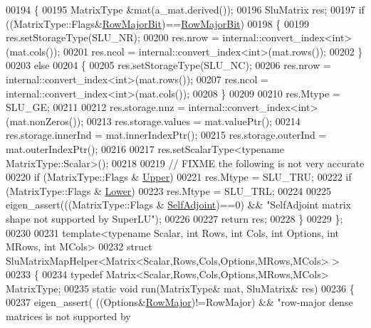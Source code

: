 \begin{DoxyCode}
00194   \{
00195     MatrixType &mat(a\_mat.derived());
00196     SluMatrix res;
00197     \textcolor{keywordflow}{if} ((MatrixType::Flags&\hyperlink{group__flags_gae4f56c2a60bbe4bd2e44c5b19cbe8762}{RowMajorBit})==\hyperlink{group__flags_gae4f56c2a60bbe4bd2e44c5b19cbe8762}{RowMajorBit})
00198     \{
00199       res.setStorageType(SLU\_NR);
00200       res.nrow      = internal::convert\_index<int>(mat.cols());
00201       res.ncol      = internal::convert\_index<int>(mat.rows());
00202     \}
00203     \textcolor{keywordflow}{else}
00204     \{
00205       res.setStorageType(SLU\_NC);
00206       res.nrow      = internal::convert\_index<int>(mat.rows());
00207       res.ncol      = internal::convert\_index<int>(mat.cols());
00208     \}
00209 
00210     res.Mtype       = SLU\_GE;
00211 
00212     res.storage.nnz       = internal::convert\_index<int>(mat.nonZeros());
00213     res.storage.values    = mat.valuePtr();
00214     res.storage.innerInd  = mat.innerIndexPtr();
00215     res.storage.outerInd  = mat.outerIndexPtr();
00216 
00217     res.setScalarType<\textcolor{keyword}{typename} MatrixType::Scalar>();
00218 
00219     \textcolor{comment}{// FIXME the following is not very accurate}
00220     \textcolor{keywordflow}{if} (MatrixType::Flags & \hyperlink{group__enums_gga39e3366ff5554d731e7dc8bb642f83cda6bcb58be3b8b8ec84859ce0c5ac0aaec}{Upper})
00221       res.Mtype = SLU\_TRU;
00222     \textcolor{keywordflow}{if} (MatrixType::Flags & \hyperlink{group__enums_gga39e3366ff5554d731e7dc8bb642f83cda891792b8ed394f7607ab16dd716f60e6}{Lower})
00223       res.Mtype = SLU\_TRL;
00224 
00225     eigen\_assert(((MatrixType::Flags & \hyperlink{group__enums_gga39e3366ff5554d731e7dc8bb642f83cda2491fc6765056421f504eb7e16083e8f}{SelfAdjoint})==0) && \textcolor{stringliteral}{"SelfAdjoint matrix shape not
       supported by SuperLU"});
00226 
00227     \textcolor{keywordflow}{return} res;
00228   \}
00229 \};
00230 
00231 \textcolor{keyword}{template}<\textcolor{keyword}{typename} Scalar, \textcolor{keywordtype}{int} Rows, \textcolor{keywordtype}{int} Cols, \textcolor{keywordtype}{int} Options, \textcolor{keywordtype}{int} MRows, \textcolor{keywordtype}{int} MCols>
00232 \textcolor{keyword}{struct }SluMatrixMapHelper<Matrix<Scalar,Rows,Cols,Options,MRows,MCols> >
00233 \{
00234   \textcolor{keyword}{typedef} Matrix<Scalar,Rows,Cols,Options,MRows,MCols> MatrixType;
00235   \textcolor{keyword}{static} \textcolor{keywordtype}{void} run(MatrixType& mat, SluMatrix& res)
00236   \{
00237     eigen\_assert( ((Options&\hyperlink{group__enums_ggaacded1a18ae58b0f554751f6cdf9eb13acfcde9cd8677c5f7caf6bd603666aae3}{RowMajor})!=RowMajor) && \textcolor{stringliteral}{"row-major dense matrices is not supported by
}
\end{DoxyCode}
